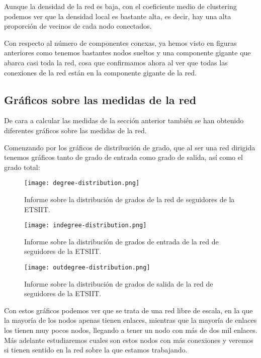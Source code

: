 Aunque la densidad de la red es baja, con el coeficiente medio de clustering podemos ver que la densidad local es bastante alta, es decir, hay una alta proporción de vecinos de cada nodo conectados.

Con respecto al número de componentes conexas, ya hemos visto en figuras anteriores como tenemos bastantes nodos sueltos y una componente gigante que abarca casi toda la red, cosa que confirmamos ahora al ver que todas las conexiones de la red están en la componente gigante de la red.

\subsection{Gráficos sobre las medidas de la red}

De cara a calcular las medidas de la sección anterior también se han obtenido diferentes gráficos sobre las medidas de la red.

Comenzando por los gráficos de distribución de grado, que al ser una red dirigida tenemos gráficos tanto de grado de entrada como grado de salida, así como el grado total:

\begin{figure}[H]
  \centering
  \texttt{[image: degree-distribution.png]}
  \caption{Informe sobre la distribución de grados de la red de seguidores de la ETSIIT.}
  \label{fig:degree-distribution}
\end{figure}

\begin{figure}[H]
  \centering
  \texttt{[image: indegree-distribution.png]}
  \caption{Informe sobre la distribución de grados de entrada de la red de seguidores de la ETSIIT.}
  \label{fig:indegree-distribution}
\end{figure}

\begin{figure}[H]
  \centering
  \texttt{[image: outdegree-distribution.png]}
  \caption{Informe sobre la distribución de grados de salida de la red de seguidores de la ETSIIT.}
  \label{fig:outdegree-distribution}
\end{figure}

Con estos gráficos podemos ver que se trata de una red libre de escala, en la que la mayoría de los nodos apenas tienen enlaces, mientras que la mayoría de enlaces los tienen muy pocos nodos, llegando a tener un nodo con más de dos mil enlaces. Más adelante estudiaremos cuales son estos nodos con más conexiones y veremos si tienen sentido en la red sobre la que estamos trabajando.

